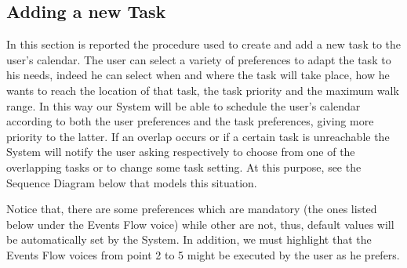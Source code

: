 \subsection{Adding a new Task}
In this section is reported the procedure used to create and add a new task to the user's calendar.
The user can select a variety of preferences to adapt the task to his needs, indeed he can select when and where the task will take place, how he wants to reach the location of that task, the task priority and the maximum walk range. In this way our System will be able to schedule the user's calendar according to both the user preferences and the task preferences, giving more priority to the latter. If an overlap occurs or if a certain task is unreachable the System will notify the user asking respectively to choose from one of the overlapping tasks or to change some task setting. At this purpose, see the Sequence Diagram below that models this situation.     

Notice that, there are some preferences which are mandatory (the ones listed below under the Events Flow voice) while other are not, thus, default values will be automatically set by the System. In addition, we must highlight that the Events Flow voices from point 2 to 5 might be executed by the user as he prefers.


